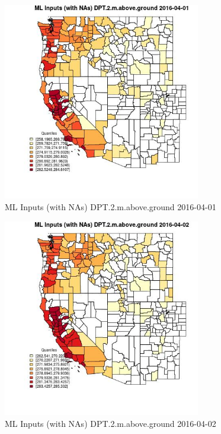 \clearpage 

\begin{figure} 
\centering  
\includegraphics[width=0.77\textwidth]{Code_Outputs/Report_ML_input_PM25_Step4_part_e_de_duplicated_aveswNAs_CountyDPT2mabovegroundMean2016-04-01_2016-04-01.jpg} 
\caption{\label{fig:Report_ML_input_PM25_Step4_part_e_de_duplicated_aveswNAsCountyDPT2mabovegroundMean2016-04-01_2016-04-01}ML Inputs (with NAs) DPT.2.m.above.ground 2016-04-01} 
\end{figure} 
 

\begin{figure} 
\centering  
\includegraphics[width=0.77\textwidth]{Code_Outputs/Report_ML_input_PM25_Step4_part_e_de_duplicated_aveswNAs_CountyDPT2mabovegroundMean2016-04-02_2016-04-02.jpg} 
\caption{\label{fig:Report_ML_input_PM25_Step4_part_e_de_duplicated_aveswNAsCountyDPT2mabovegroundMean2016-04-02_2016-04-02}ML Inputs (with NAs) DPT.2.m.above.ground 2016-04-02} 
\end{figure} 
 

